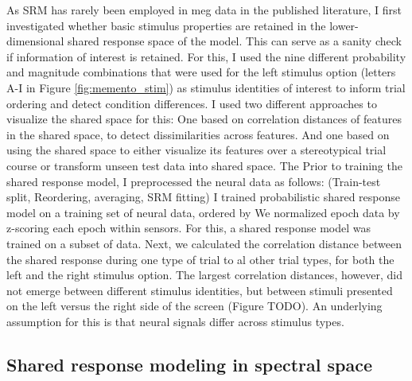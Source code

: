 As \gls{SRM} has rarely been employed in \gls{meg} data in the published literature, I first investigated whether basic stimulus properties are retained in the lower-dimensional shared response space of the model.
This can serve as a sanity check if information of interest is retained.
For this, I used the nine different probability and magnitude combinations that were used for the left stimulus option (letters A-I in Figure \ref{fig:memento_stim}) as stimulus identities of interest to inform trial ordering and detect condition differences.
I used two different approaches to visualize the shared space for this:
One based on correlation distances of features in the shared space, to detect dissimilarities across features.
And one based on using the shared space to either visualize its features over a stereotypical trial course or transform unseen test data into shared space.
The
Prior to training the shared response model, I preprocessed the neural data as follows:
(Train-test split, Reordering, averaging, SRM fitting)
I trained probabilistic shared response model on a training set of neural data, ordered by
We normalized epoch data by z-scoring each epoch within sensors.
For this, a shared response model was trained on a subset of data.
Next, we calculated the correlation distance between the shared response during one type of trial to al other trial types, for both the left and the right stimulus option.
The largest correlation distances, however, did not emerge between different stimulus identities, but between stimuli presented on the left versus the right side of the screen (Figure TODO).
An underlying assumption for this is that neural signals differ across stimulus types.


\subsection{Shared response modeling in spectral space}

